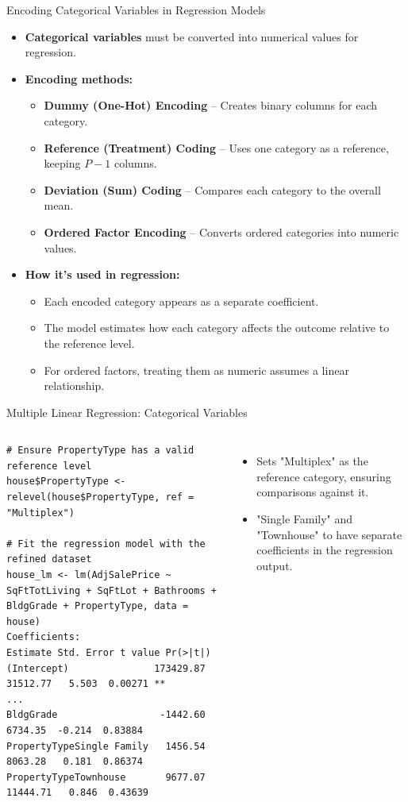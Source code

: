 \documentclass{beamer}
\begin{document}
	
	\begin{frame}{Encoding Categorical Variables in Regression Models}
		\begin{itemize}
			\item \textbf{Categorical variables} must be converted into numerical values for regression.
			\item \textbf{Encoding methods:}
			\begin{itemize}
				\item \textbf{Dummy (One-Hot) Encoding} – Creates binary columns for each category.
				\item \textbf{Reference (Treatment) Coding} – Uses one category as a reference, keeping $P - 1$ columns.
				\item \textbf{Deviation (Sum) Coding} – Compares each category to the overall mean.
				\item \textbf{Ordered Factor Encoding} – Converts ordered categories into numeric values.
			\end{itemize}
			\item \textbf{How it’s used in regression:}
			\begin{itemize}
				\item Each encoded category appears as a separate coefficient.
				\item The model estimates how each category affects the outcome relative to the reference level.
				\item For ordered factors, treating them as numeric assumes a linear relationship.
			\end{itemize}
		\end{itemize}
	\end{frame}
	

	\begin{frame}[fragile]{Multiple Linear Regression: Categorical Variables}
		\begin{columns}
			\begin{lstlisting}
# Ensure PropertyType has a valid reference level
house$PropertyType <- relevel(house$PropertyType, ref = "Multiplex")

# Fit the regression model with the refined dataset
house_lm <- lm(AdjSalePrice ~ SqFtTotLiving + SqFtLot + Bathrooms + BldgGrade + PropertyType, data = house)
Coefficients:
Estimate Std. Error t value Pr(>|t|)   
(Intercept)               173429.87   31512.77   5.503  0.00271 **
...
BldgGrade                  -1442.60    6734.35  -0.214  0.83884   
PropertyTypeSingle Family   1456.54    8063.28   0.181  0.86374   
PropertyTypeTownhouse       9677.07   11444.71   0.846  0.43639 
			\end{lstlisting}
			\begin{itemize}
				\item Sets "Multiplex" as the reference category, ensuring comparisons against it.
				\item "Single Family" and "Townhouse" to have separate coefficients in the regression output.
			\end{itemize}
		\end{columns}
	\end{frame}
\end{document}
